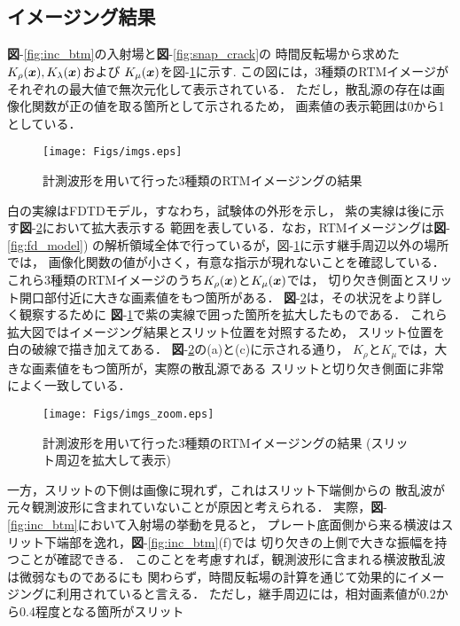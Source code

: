 \subsection{イメージング結果}
{\bf 図}-\ref{fig:inc_btm}の入射場と{\bf 図}-\ref{fig:snap_crack}の
時間反転場から求めた$K_\rho(\boldsymbol{x}),K_{\lambda}(\boldsymbol{x})$および
$K_{\mu}(\boldsymbol{x})$を{図-}\ref{fig:imgs}に示す. 
この図には，3種類のRTMイメージがそれぞれの最大値で無次元化して表示されている．
ただし，散乱源の存在は画像化関数が正の値を取る箇所として示されるため，
画素値の表示範囲は0から1としている．
\begin{figure}[tbh]
\centering
	\texttt{[image: Figs/imgs.eps]}
	\caption{計測波形を用いて行った3種類のRTMイメージングの結果}
	\label{fig:imgs}
\end{figure}
白の実線はFDTDモデル，すなわち，試験体の外形を示し，
紫の実線は後に示す{\bf 図}-\ref{fig:imgs_zoom}において拡大表示する
範囲を表している．なお，RTMイメージングは{\bf 図}-\ref{fig:fd_model})
の解析領域全体で行っているが，{図-}\ref{fig:imgs}に示す継手周辺以外の場所では，
画像化関数の値が小さく，有意な指示が現れないことを確認している．
\\
\hspace{\parindent}
これら3種類のRTMイメージのうち$K_\rho(\boldsymbol{x})$と$K_{\mu}(\boldsymbol{x})$では，
切り欠き側面とスリット開口部付近に大きな画素値をもつ箇所がある．
{\bf 図}-\ref{fig:imgs_zoom}は，その状況をより詳しく観察するために
{\bf 図}-\ref{fig:imgs}で紫の実線で囲った箇所を拡大したものである．
これら拡大図ではイメージング結果とスリット位置を対照するため，
スリット位置を白の破線で描き加えてある．
{\bf 図}-\ref{fig:imgs_zoom}の(a)と(c)に示される通り，
$K_\rho$と$K_\mu$では，大きな画素値をもつ箇所が，実際の散乱源である
スリットと切り欠き側面に非常によく一致している．
\begin{figure}[tbh]
\centering
	\texttt{[image: Figs/imgs\_zoom.eps]}
	\caption{計測波形を用いて行った3種類のRTMイメージングの結果
	(スリット周辺を拡大して表示)}
	\label{fig:imgs_zoom}
\end{figure}
一方，スリットの下側は画像に現れず，これはスリット下端側からの
散乱波が元々観測波形に含まれていないことが原因と考えられる．
実際，{\bf 図}-\ref{fig:inc_btm}において入射場の挙動を見ると，
プレート底面側から来る横波はスリット下端部を逸れ，{\bf 図}-\ref{fig:inc_btm}(f)では
切り欠きの上側で大きな振幅を持つことが確認できる．
このことを考慮すれば，観測波形に含まれる横波散乱波は微弱なものであるにも
関わらず，時間反転場の計算を通じて効果的にイメージングに利用されていると言える．
ただし，継手周辺には，相対画素値が0.2から0.4程度となる箇所がスリット
